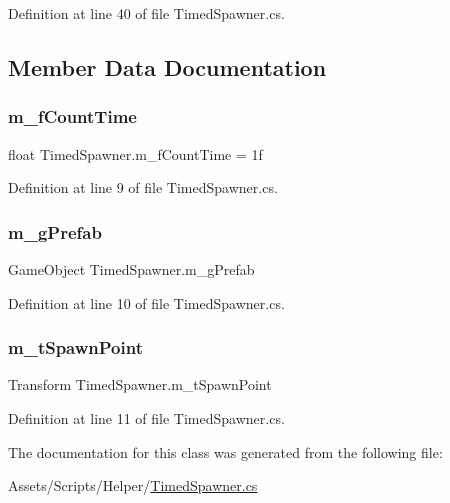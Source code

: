 Definition at line 40 of file Timed\+Spawner.\+cs.



\subsection{Member Data Documentation}
\mbox{\label{class_timed_spawner_a76283a3f5526a4a64c636c12e2efaf9d}} 
\subsubsection{\texorpdfstring{m\+\_\+f\+Count\+Time}{m\_fCountTime}}
{\footnotesize\ttfamily float Timed\+Spawner.\+m\+\_\+f\+Count\+Time = 1f}



Definition at line 9 of file Timed\+Spawner.\+cs.

\mbox{\label{class_timed_spawner_abf1afa5f5af371194f717a23e41b19db}} 
\subsubsection{\texorpdfstring{m\+\_\+g\+Prefab}{m\_gPrefab}}
{\footnotesize\ttfamily Game\+Object Timed\+Spawner.\+m\+\_\+g\+Prefab}



Definition at line 10 of file Timed\+Spawner.\+cs.

\mbox{\label{class_timed_spawner_a03e7bbaf25baec333337c7d4d64aa890}} 
\subsubsection{\texorpdfstring{m\+\_\+t\+Spawn\+Point}{m\_tSpawnPoint}}
{\footnotesize\ttfamily Transform Timed\+Spawner.\+m\+\_\+t\+Spawn\+Point}



Definition at line 11 of file Timed\+Spawner.\+cs.



The documentation for this class was generated from the following file\+:\begin{DoxyCompactItemize}
\item 
Assets/\+Scripts/\+Helper/\mbox{\hyperlink{_timed_spawner_8cs}{Timed\+Spawner.\+cs}}\end{DoxyCompactItemize}
